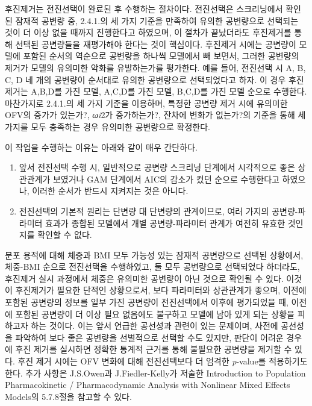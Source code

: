 \documentclass[
  10pt,
]{krantz}
\begin{document}
후진제거는 전진선택이 완료된 후 수행하는 절차이다. 전진선택은 스크리닝에서 확인된 잠재적 공변량 중, 2.4.1.의 세 가지
기준을 만족하여 유의한 공변량으로 선택되는 것이 더 이상 없을 때까지 진행한다고 하였으며, 이 절차가 끝났더라도
후진제거를 통해 선택된 공변량들을 재평가해야 한다는 것이 핵심이다. 후진제거 시에는 공변량이 모델에 포함된 순서의
역순으로 공변량을 하나씩 모델에서 빼 보면서, 그러한 공변량의 제거가 모델의 유의미한 악화를 유발하는가를 평가한다. 예를
들어, 전진선택 시 A, B, C, D 네 개의 공변량이 순서대로 유의한 공변량으로 선택되었다고 하자. 이 경우 후진
제거는 A,B,D를 가진 모델, A,C,D를 가진 모델, B,C,D를 가진 모델 순으로 수행한다. 마찬가지로
2.4.1.의 세 가지 기준을 이용하며, 특정한 공변량 제거 시에 유의미한 OFV의 증가가 있는가?,
\emph{ωi}2가 증가하는가?, 잔차에 변화가 없는가?의 기준을 통해 세 가지를 모두 충족하는
경우 유의미한 공변량으로 확정한다.

이 작업을 수행하는 이유는 아래와 같이 매우 간단하다.

\begin{enumerate}
\def\labelenumi{\arabic{enumi})}
\item
  앞서 전진선택 수행 시, 일반적으로 공변량 스크리닝 단계에서 시각적으로 좋은 상관관계가 보였거나 GAM 단계에서 AIC의
  감소가 컸던 순으로 수행한다고 하였으나, 이러한 순서가 반드시 지켜지는 것은 아니다.
\item
  전진선택의 기본적 원리는 단변량 대 단변량의 관계이므로, 여러 가지의 공변량-파라미터 효과가 종합된 모델에서 개별
  공변량-파라미터 관계가 여전히 유효한 것인지를 확인할 수 없다.
\end{enumerate}

분포 용적에 대해 체중과 BMI 모두 가능성 있는 잠재적 공변량으로 선택된 상황에서, 체중-BMI 순으로 전진선택을 수행하였고,
둘 모두 공변량으로 선택되었다 하더라도, 후진제거 실시 과정에서 체중은 유의미한 공변량이 아닌 것으로 확인될 수 있다. 이것이
후진제거가 필요한 단적인 상황으로서, 보다 파라미터와 상관관계가 좋으며, 이전에 포함된 공변량의 정보를 일부 가진 공변량이
전진선택에서 이후에 평가되었을 때, 이전에 포함된 공변량이 더 이상 필요 없음에도 불구하고 모델에 남아 있게 되는
상황을 피하고자 하는 것이다. 이는 앞서 언급한 공선성과 관련이 있는 문제이며, 사전에 공선성을 파악하여 보다 좋은 공변량을
선별적으로 선택할 수도 있지만, 판단이 어려운 경우에 후진 제거를 실시하면 정확한 통계적 근거를 통해 불필요한 공변량을 제거할
수 있다. 후진 제거 시에는 OFV 변화에 대해 전진선택보다 더 엄격한 \emph{p}-value를 적용하기도 한다. 추가 사항은
J.S.Owen과 J.Fiedler-Kelly가 저술한 Introduction to Population
Pharmacokinetic / Pharmacodynamic Analysis with Nonlinear Mixed Effects
Models의 5.7.8절을 참고할 수 있다.
\end{document}
